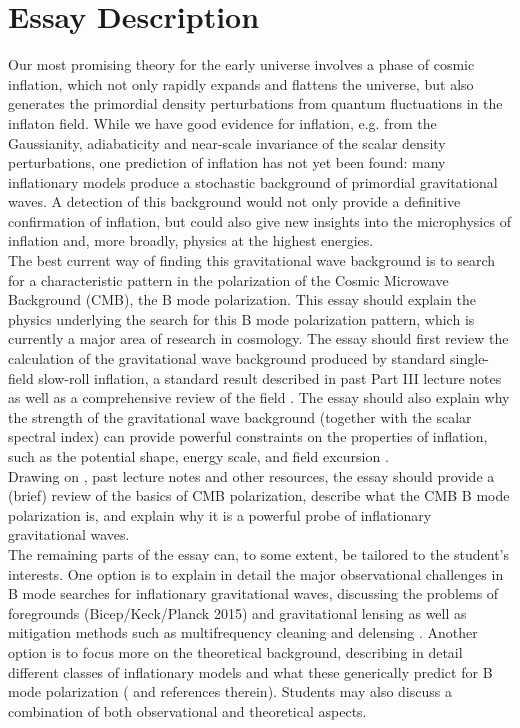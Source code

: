 \documentclass[a4paper,10pt]{article}
\begin{document}
\section{Essay Description}
Our most promising theory for the early universe involves a phase of cosmic inflation, which not only rapidly expands and flattens the universe, but also generates the primordial density perturbations from quantum fluctuations in the inflaton field. While we have good evidence for inflation, e.g. from the Gaussianity, adiabaticity and near-scale invariance of the scalar density perturbations, one prediction of inflation has not yet been found: many inflationary models produce a stochastic background of primordial gravitational waves. A detection of this background would not only provide a definitive confirmation of inflation, but could also give new insights into the microphysics of inflation and, more broadly, physics at the highest energies.\\

The best current way of finding this gravitational wave background is to search for a characteristic pattern in the polarization of the Cosmic Microwave Background (CMB), the B mode polarization. This essay should explain the physics underlying the search for this B mode polarization pattern, which is currently a major area of research in cosmology. The essay should first review the calculation of the gravitational wave background produced by standard single-field slow-roll inflation, a standard result described in past Part III lecture notes as well as a comprehensive review of the field \cite{QBM}. The essay should also explain why the strength of the gravitational wave background (together with the scalar spectral index) can provide powerful constraints on the properties of inflation, such as the potential shape, energy scale, and field excursion \cite{S4, QBM}.\\

Drawing on \cite{S4, QBM}, past lecture notes and other resources, the essay should provide a (brief) review of the basics of CMB polarization, describe what the CMB B mode polarization is, and explain why it is a powerful probe of inflationary gravitational waves.\\

The remaining parts of the essay can, to some extent, be tailored to the student’s interests. One option is to explain in detail the major observational challenges in B mode searches for inflationary gravitational waves, discussing the problems of foregrounds (Bicep/Keck/Planck 2015) and gravitational lensing as well as mitigation methods such as multifrequency cleaning and delensing \cite{smith}. Another option is to focus more on the theoretical background, describing in detail different classes of inflationary models and what these generically predict for B mode polarization (\cite{S4} and references therein). Students may also discuss a combination of both observational and theoretical aspects.\\
\end{document}
